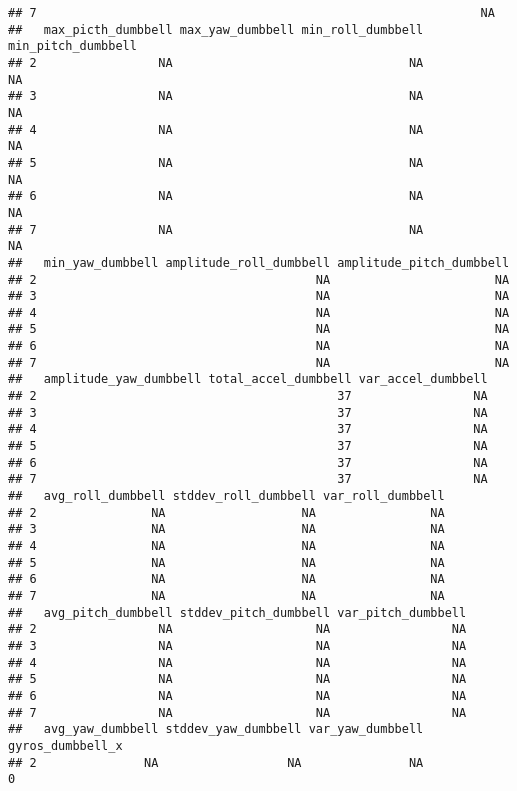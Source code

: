 \documentclass[]{article}
\begin{document}
\begin{verbatim}
## 7                                                              NA
##   max_picth_dumbbell max_yaw_dumbbell min_roll_dumbbell min_pitch_dumbbell
## 2                 NA                                 NA                 NA
## 3                 NA                                 NA                 NA
## 4                 NA                                 NA                 NA
## 5                 NA                                 NA                 NA
## 6                 NA                                 NA                 NA
## 7                 NA                                 NA                 NA
##   min_yaw_dumbbell amplitude_roll_dumbbell amplitude_pitch_dumbbell
## 2                                       NA                       NA
## 3                                       NA                       NA
## 4                                       NA                       NA
## 5                                       NA                       NA
## 6                                       NA                       NA
## 7                                       NA                       NA
##   amplitude_yaw_dumbbell total_accel_dumbbell var_accel_dumbbell
## 2                                          37                 NA
## 3                                          37                 NA
## 4                                          37                 NA
## 5                                          37                 NA
## 6                                          37                 NA
## 7                                          37                 NA
##   avg_roll_dumbbell stddev_roll_dumbbell var_roll_dumbbell
## 2                NA                   NA                NA
## 3                NA                   NA                NA
## 4                NA                   NA                NA
## 5                NA                   NA                NA
## 6                NA                   NA                NA
## 7                NA                   NA                NA
##   avg_pitch_dumbbell stddev_pitch_dumbbell var_pitch_dumbbell
## 2                 NA                    NA                 NA
## 3                 NA                    NA                 NA
## 4                 NA                    NA                 NA
## 5                 NA                    NA                 NA
## 6                 NA                    NA                 NA
## 7                 NA                    NA                 NA
##   avg_yaw_dumbbell stddev_yaw_dumbbell var_yaw_dumbbell gyros_dumbbell_x
## 2               NA                  NA               NA                0

\end{verbatim}
\end{document}
